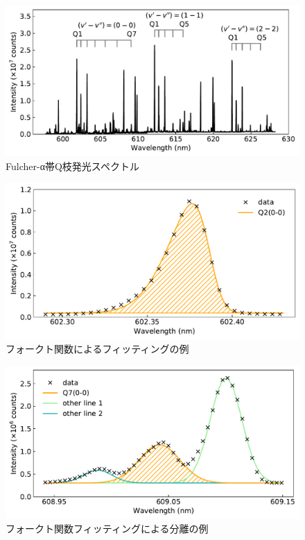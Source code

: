 \begin{figure}
    \centering
    \includegraphics[width=15cm]{pictures/all-spectrum.pdf}
    \caption{Fulcher-α帯Q枝発光スペクトル}
    \label{fig:all-spectrum}
\end{figure}

\begin{figure}
    \centering
    \includegraphics[width=15cm]{pictures/skewed-gaussian-fitting-00_Q2.pdf}
    \caption{フォークト関数によるフィッティングの例}
    \label{fig:voigt-fitting-1}
\end{figure}

\begin{figure}
    \centering
    \includegraphics[width=15cm]{pictures/skewed-gaussian-fitting-00_Q7.pdf}
    \caption{フォークト関数フィッティングによる分離の例}
    \label{fig:voigt-fitting-2}
\end{figure}

